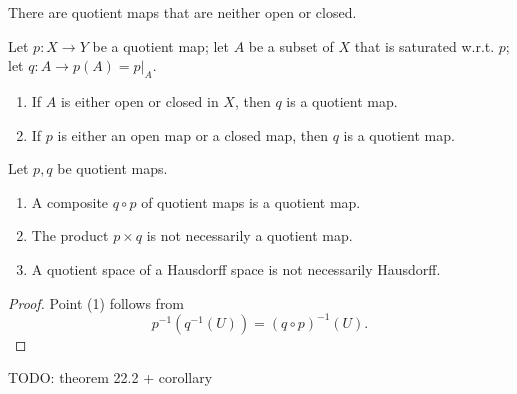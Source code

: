 There are quotient maps that are neither open or closed.
\begin{proposition}
Let $p:X\to Y$ be a quotient map; let $A$ be a subset of $X$ that is saturated w.r.t. $p$; let $q:A\to p(A) = p|_{A}$.
\begin{enumerate}
\item If $A$ is either open or closed in $X$, then $q$ is a quotient map.
\item If $p$ is either an open map or a closed map, then $q$ is a quotient map.
\end{enumerate}
\end{proposition}
\begin{lemma}
Let $p,q$ be quotient maps.
\begin{enumerate}
\item A composite $q\circ p$ of quotient maps is a quotient map.
\item The product $p\times q$ is not necessarily a quotient map.
\item A quotient space of a Hausdorff space is not necessarily Hausdorff.
\end{enumerate}
\end{lemma}
\begin{proof}
Point (1) follows from
\[ p^{-1}(q^{-1}(U)) = (q\circ p)^{-1}(U). \]
\end{proof}
TODO: theorem 22.2 + corollary



